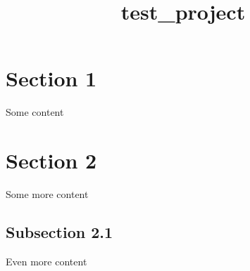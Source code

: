 \documentclass{article}
\title{test_project}
\author{}
\begin{document}
\section{Section 1}
Some content

\section{Section 2}
Some more content

\subsection{Subsection 2.1}
Even more content
\end{document}
